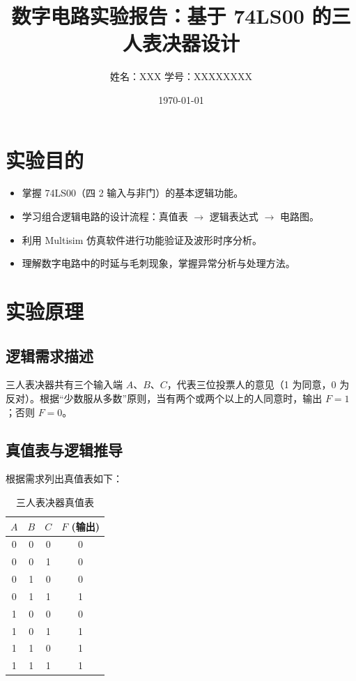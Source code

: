\documentclass[12pt,a4paper]{article}
\begin{document}
\title{\textbf{数字电路实验报告：基于 74LS00 的三人表决器设计}}
\author{姓名：XXX \quad 学号：XXXXXXXX}
\date{\today}
\maketitle

\section{实验目的}
\begin{itemize}
    \item 掌握 74LS00（四 2 输入与非门）的基本逻辑功能。
    \item 学习组合逻辑电路的设计流程：真值表 $\rightarrow$ 逻辑表达式 $\rightarrow$ 电路图。
    \item 利用 Multisim 仿真软件进行功能验证及波形时序分析。
    \item 理解数字电路中的时延与毛刺现象，掌握异常分析与处理方法。
\end{itemize}

\section{实验原理}

\subsection{逻辑需求描述}
三人表决器共有三个输入端 $A$、$B$、$C$，代表三位投票人的意见（1 为同意，0 为反对）。根据“少数服从多数”原则，当有两个或两个以上的人同意时，输出 $F=1$；否则 $F=0$。

\subsection{真值表与逻辑推导}
根据需求列出真值表如下：

\begin{table}[H]
\centering
\caption{三人表决器真值表}
\begin{tabular}{ccc|c}
\toprule
$A$ & $B$ & $C$ & $F$ (输出) \\
\midrule
0 & 0 & 0 & 0 \\
0 & 0 & 1 & 0 \\
0 & 1 & 0 & 0 \\
0 & 1 & 1 & 1 \\
1 & 0 & 0 & 0 \\
1 & 0 & 1 & 1 \\
1 & 1 & 0 & 1 \\
1 & 1 & 1 & 1 \\
\bottomrule
\end{tabular}
\end{table}
\end{document}
